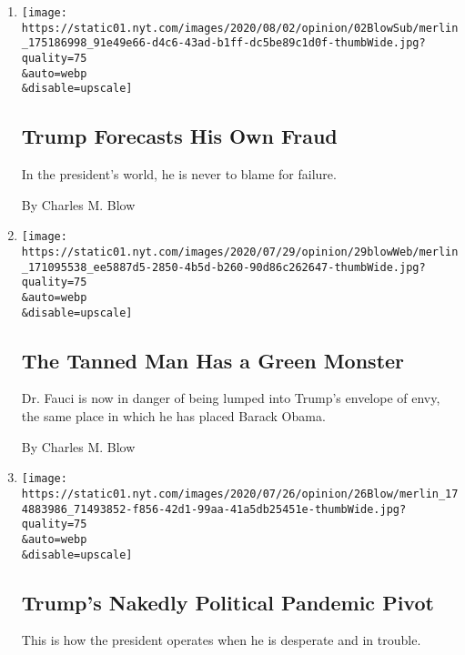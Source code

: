 \begin{enumerate}
\def\labelenumi{\arabic{enumi}.}
\item
  \href{/2020/08/02/opinion/trump-2020-election.html}{}

  \texttt{[image: https://static01.nyt.com/images/2020/08/02/opinion/02BlowSub/merlin\_175186998\_91e49e66-d4c6-43ad-b1ff-dc5be89c1d0f-thumbWide.jpg?quality=75\\\&auto=webp\\\&disable=upscale]}

  \hypertarget{trump-forecasts-his-own-fraud}{%
  \subsection{Trump Forecasts His Own
  Fraud}\label{trump-forecasts-his-own-fraud}}

  In the president's world, he is never to blame for failure.

  By Charles M. Blow
\item
  \href{/2020/07/29/opinion/anthony-fauci-trump.html}{}

  \texttt{[image: https://static01.nyt.com/images/2020/07/29/opinion/29blowWeb/merlin\_171095538\_ee5887d5-2850-4b5d-b260-90d86c262647-thumbWide.jpg?quality=75\\\&auto=webp\\\&disable=upscale]}

  \hypertarget{the-tanned-man-has-a-green-monster}{%
  \subsection{The Tanned Man Has a Green
  Monster}\label{the-tanned-man-has-a-green-monster}}

  Dr. Fauci is now in danger of being lumped into Trump's envelope of
  envy, the same place in which he has placed Barack Obama.

  By Charles M. Blow
\item
  \href{/2020/07/26/opinion/trump-coronavirus-convention.html}{}

  \texttt{[image: https://static01.nyt.com/images/2020/07/26/opinion/26Blow/merlin\_174883986\_71493852-f856-42d1-99aa-41a5db25451e-thumbWide.jpg?quality=75\\\&auto=webp\\\&disable=upscale]}

  \hypertarget{trumps-nakedly-political-pandemic-pivot}{%
  \subsection{Trump's Nakedly Political Pandemic
  Pivot}\label{trumps-nakedly-political-pandemic-pivot}}

  This is how the president operates when he is desperate and in
  trouble.


\end{enumerate}

